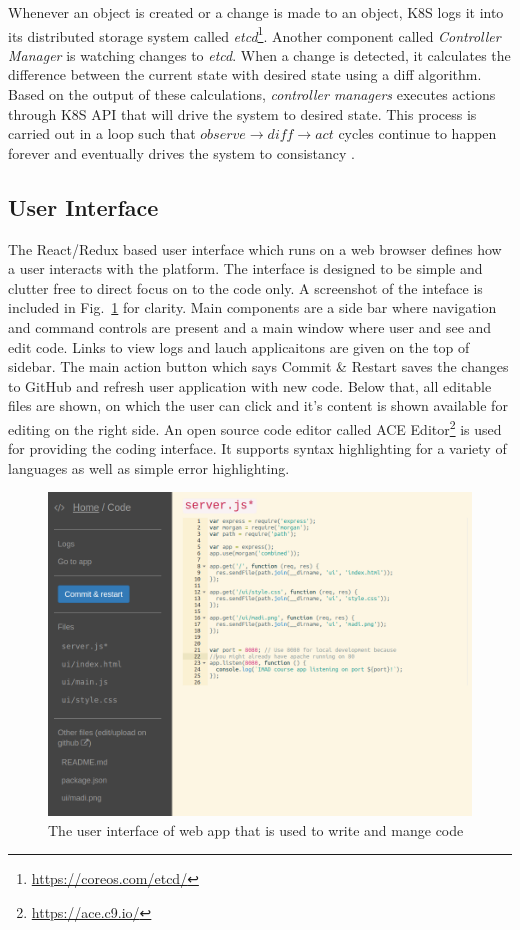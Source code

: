 \documentclass[DD]{iitmdiss}
\begin{document}
Whenever an object is created or a change is made to an object, K8S logs it into its distributed storage system called \textit{etcd}\footnote{\url{https://coreos.com/etcd/}}. Another component called \textit{Controller Manager} is watching changes to \textit{etcd}. When a change is detected, it calculates the difference between the current state with desired state using a diff algorithm. Based on the output of these calculations, \textit{controller managers} executes actions through K8S API that will drive the system to desired state. This process is carried out in a loop such that $observe \rightarrow diff \rightarrow act$ cycles continue to happen forever and eventually drives the system to consistancy \citep{vogels_eventually_2009}.

\subsection{User Interface}
The React/Redux based user interface which runs on a web browser defines how a user interacts with the platform. The interface is designed to be simple and clutter free to direct focus on to the code only. A screenshot of the inteface is included in Fig.~\ref{fig:codeinterface} for clarity. Main components are a side bar where navigation and command controls are present and a main window where user and see and edit code. Links to view logs and lauch applicaitons are given on the top of sidebar. The main action button which says Commit \& Restart saves the changes to GitHub and refresh user application with new code. Below that, all editable files are shown, on which the user can click and it's content is shown available for editing on the right side. An open source code editor called ACE Editor\footnote{\url{https://ace.c9.io/}} is used for providing the coding interface. It supports syntax highlighting for a variety of languages as well as simple error highlighting.

\begin{figure}
	\centering
	\includegraphics[width=0.9\linewidth]{img/code_interface}
	\caption[User interface]{The user interface of web app that is used to write and mange code}
	\label{fig:codeinterface}
\end{figure}
\end{document}
